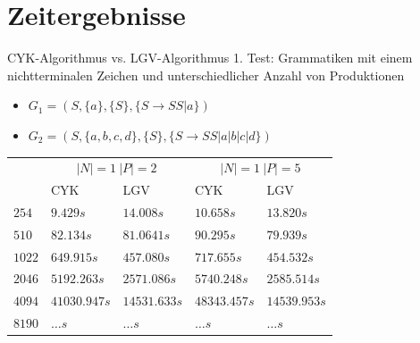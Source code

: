 \documentclass{beamer}
\begin{document}
	\section{Zeitergebnisse}
	
	\begin{frame}{CYK-Algorithmus vs. LGV-Algorithmus}
		1. Test: Grammatiken mit einem nichtterminalen Zeichen und unterschiedlicher Anzahl von Produktionen
		\pause
		\begin{itemize}
			\item $G_1 = (S, \{a\}, \{S\}, \{S\to SS | a\})$
			\item $G_2 = (S, \{a,b,c,d\}, \{S\}, \{S\to SS | a | b | c |d\})$
		\end{itemize}
		\pause
		\begin{table}[H]
			\centering
			\begin{tabular}{|m{2cm}||m{1.7cm}|m{1.7cm}||m{1.7cm}|m{1.7cm}|} 
				\hline
				\multirow{2}{*}{\diagbox[width=\dimexpr \textwidth/8+4.5\tabcolsep\relax, height=1cm]{$|w|$}{$Grammatik$}}& \multicolumn{2}{c||}{$|N|=1 \ |P|=2$} & \multicolumn{2}{c|}{$|N|=1 \ |P|=5$}\\ [0.5ex] 
				\cline{2-5}
				& CYK & LGV & CYK & LGV\\
				\hline\hline
				$254$ & $9.429s$ & $14.008s$ &$10.658s$&$13.820s$\\[1ex]
				\hline
				$510$ & $82.134s$ & \cellcolor{lightgray}$81.0641s$ & $90.295s$&\cellcolor{lightgray}$79.939s$\\[1ex]
				\hline
				$1022$ & $649.915s$ & \cellcolor{green}$457.080s$ & $717.655s$&\cellcolor{green}$454.532s$\\[1ex]
				\hline
				$2046$ & $5192.263s$ & $2571.086s$ & $5740.248s$&$2585.514s$\\[1ex]
				\hline
				$4094$ & $41030.947s$ & $14531.633s$ & $48343.457s$&$14539.953s$\\[1ex]
				\hline
				$8190$ & $\ldots s$ & $\ldots s$ & $\ldots s$ & $\ldots s$ \\[1ex]
				\hline
			\end{tabular}
		\end{table}
	\end{frame}

	
	
\end{document}
